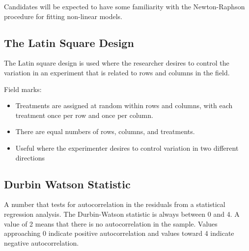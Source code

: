 Candidates will be expected to have some familiarity with the Newton-Raphson procedure for fitting non-linear models.

\newpage
\subsection*{The Latin Square Design}
The Latin square design is used where the researcher desires to control the variation in an experiment that is related to rows and columns in the field.

Field marks: 
\begin{itemize}
\item Treatments are assigned at random within rows and columns, with each treatment once per row and once per column. 
\item There are equal numbers of rows, columns, and treatments. 
\item Useful where the experimenter desires to control variation in two different directions 
\end{itemize}
\newpage
\subsection*{Durbin Watson Statistic}

A number that tests for autocorrelation in the residuals from a statistical regression analysis. 
The Durbin-Watson statistic is always between 0 and 4. 
A value of 2 means that there is no autocorrelation in the sample. 
Values approaching 0 indicate positive autocorrelation and values toward 4 indicate negative autocorrelation. 


